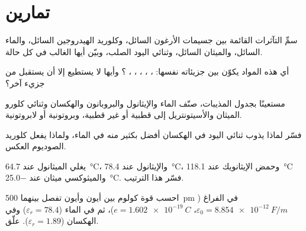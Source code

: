 \section{تمارين}

\begin{exercise}[$\star$]\label{exo:b1:intermolecular-forces-solvents:1}
سمِّ التآثرات القائمة بين جسيمات الأرغون السائل،
وكلوريد الهيدروجين السائل، والماء السائل، والميثان السائل، وثنائي اليود
الصلب، وبيّن أيها الغالب في كل حالة.
\end{exercise}

\begin{exercise}[$\star$]\label{exo:b1:intermolecular-forces-solvents:2}
أي هذه المواد يكوّن  بين جزيئاته
نفسها: ، ، ، ، ،
؟ وأيها لا يستطيع إلا أن يستقبل  من جزيء آخر؟
\end{exercise}

\begin{exercise}[$\star$]\label{exo:b1:intermolecular-forces-solvents:3}
مستعينًا بجدول المذيبات، صنّف الماء والإيثانول والبروبانون والهكسان
وثنائي كلورو الميثان والأسيتونتريل إلى قطبية أو غير قطبية، وبروتونية أو لابروتونية.
\end{exercise}

\begin{exercise}[$\star$]\label{exo:b1:intermolecular-forces-solvents:4}
فسّر لماذا يذوب ثنائي اليود في الهكسان أفضل بكثير منه في الماء،
ولماذا يفعل كلوريد الصوديوم العكس.
\end{exercise}

\begin{exercise}[$\star\star$]\label{exo:b1:intermolecular-forces-solvents:5}
يغلي الميثانول عند \qty{64.7}{\celsius}، والإيثانول عند \qty{78.4}{\celsius}،
وحمض الإيثانويك عند \qty{118.1}{\celsius} والميثوكسي ميثان عند
\qty{-25.0}{\celsius}. فسّر هذا الترتيب.
\end{exercise}

\begin{exercise}[$\star\star$]\label{exo:b1:intermolecular-forces-solvents:6}
احسب قوة كولوم بين أيون  وأيون 
تفصل بينهما \qty{500}{pm} في الفراغ ($\varepsilon_0 = \qty{8.854e-12}{F/m}$،
$e = \qty{1.602e-19}{C}$)، ثم في الماء ($\varepsilon_r = 78.4$) وفي
الهكسان ($\varepsilon_r = 1.89$). علّق.
\end{exercise}

